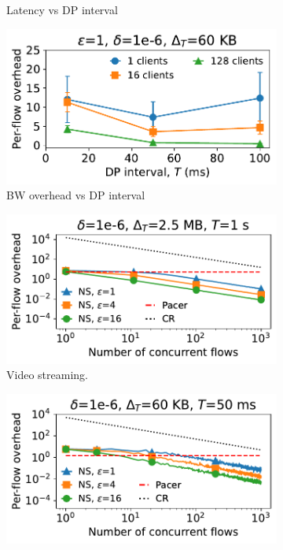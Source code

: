 \begin{figure}[t]
\begin{subfigure}[b]{0.49\columnwidth}
      \caption{Latency vs DP interval}
      \label{fig:web-lat-vs-dpInt}
  \end{subfigure}
  \hfill
  \begin{subfigure}[b]{0.49\columnwidth}
      \centering
      \includegraphics[width=\textwidth]{overhead_vs_dp_interval_web_updated.pdf}
      \caption{BW overhead vs DP interval}
      \label{fig:web-overhead-vs-dpInt}
  \end{subfigure}
  \caption{Latency and bandwidth overhead for different values of DP interval for video streaming (a, b) and for web (c, d).}
  \begin{subfigure}[b]{0.485\columnwidth}
      \centering
      \includegraphics[width=\textwidth]{overhead_vs_number_of_traces_video_bidirectional_loglog_updated.pdf}
      \caption{Video streaming.}
      \label{fig:video-overheads-compare}
  \end{subfigure}
  \hfill
  \begin{subfigure}[b]{0.485\columnwidth}
      \centering
      \includegraphics[width=\textwidth]{overhead_vs_number_of_traces_web_bidirectional_loglog_updated.pdf}

\end{subfigure}
\end{figure}
